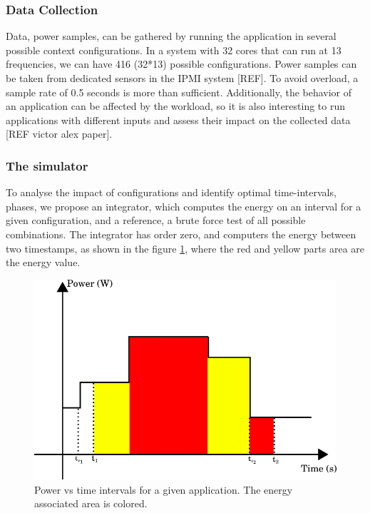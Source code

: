 \subsubsection{Data Collection}
Data, power samples, can be gathered by running the application in several possible context configurations. In a system with 32 cores that can run at 13 frequencies, we can have 416 (32*13) possible configurations. Power samples can be taken from dedicated sensors in the IPMI system [REF]. To avoid overload, a sample rate of 0.5 seconds is more than sufficient. Additionally, the behavior of an application can be affected by the workload, so it is also interesting to run applications with different inputs and assess their impact on the collected data [REF victor alex paper].


\subsubsection{The simulator}
To analyse the impact of configurations and identify optimal time-intervals, phases, we propose an integrator, which computes the energy on an interval for a given configuration, and a reference, a brute force test of all possible combinations. The integrator has order zero, and computers the energy between two timestamps, as shown in the figure \ref{fig:zero_order}, where the red and yellow parts area are the energy value.


\begin{figure}[H]
    \centering
    \includegraphics[width=\columnwidth]{phases/figures/zero_order.png}
    \caption{Power vs time intervals for a given application. The energy associated area is colored.}
    \label{fig:zero_order}
\end{figure}

